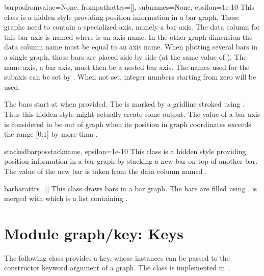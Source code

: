 \begin{classdesc}{barpos}{fromvalue=None, frompathattrs=[], %
                          subnames=None, epsilon=1e-10}
  This class is a hidden style providing position information in a bar
  graph. Those graphs need to contain a specialized axis, namely a bar
  axis. The data column for this bar axis is named  where
   is an axis name. In the other graph dimension the data
  column name must be equal to an axis name. When plotting several
  bars in a single graph, those bars are placed side by side (at the
  same value of ). The name axis, a bar axis, must then be
  a nested bar axis. The names used for the subaxis can be set by
  . When not set, integer numbers starting from zero
  will be used.

  The bars start at  when provided. The 
  is marked by a gridline stroked using . Thus this
  hidden style might actually create some output. The value of a bar
  axis is considered to be out of graph when its position in graph
  coordinates exceeds the range [0:1] by more than .
\end{classdesc} %

\begin{classdesc}{stackedbarpos}{stackname, epsilon=1e-10} %
  This class is a hidden style providing position information in a bar
  graph by stacking a new bar on top of another bar. The value of the
  new bar is taken from the data column named .
\end{classdesc} %

\begin{classdesc}{bar}{barattrs=[]} %
  This class draws bars in a bar graph. The bars are filled using
  .  is merged with 
  which is a list containing .
\end{classdesc} %

\section{Module graph/key: Keys} %
\label{graph:key}


The following class provides a key, whose instances can be passed to
the constructor keyword argument  of a graph. The class is
implemented in .

